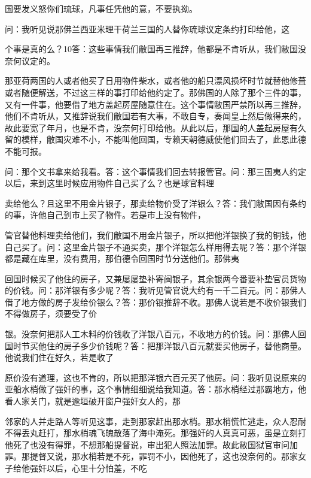 国要发义怒你们琉球，凡事任凭他的意，不要执拗。

问：我听见说那佛兰西亚米理干荷兰三国的人替你琉球议定条约打印给他，这

个事是真的么？10答：这些事情我们敝国再三推辞，他都是不肯听从，我们敝国没奈何议定的。

那亚荷两国的人或者他买了日用物件柴水，或者他的船只漂风损坏时节就替他修葺或者随便解送，不过这三样的事打印给他约定了。那佛国的人除了那个三件的事，又有一件事，他要借了地方盖起房屋随意住在。这个事情敝国严禁所以再三推辞，他们不肯听从，又推辞说我们敝国若有大事，不敢自专，奏闻皇上然后做得来的，故此要宽了年月，也是不肯，没奈何打印给他。从此以后，那国的人盖起房屋有久留的模样，敝国灾难不小，不能叫他回国，专赖天朝德威使他们回去了，此恩此德不能可报。

\vfill
\begin{BookNotes}
\end{BookNotes}

\noindent 问：那个文书拿来给我看。答：这个事情我们回去转报管官。问：那三国夷人约定以后，来到这里时候应用物件自己买了么？也是球官料理

卖给他么？且这里不用金片银子，那卖给物价受了洋银么？答：我们敝国因有条约的事，许他自己到市上买了物件。若是市上没有物件，

管官替他料理卖给他们，我们敝国不用金片银子，所以把他洋银换了我的铜钱，他自己买了。问：这里金片银子不通买卖，那个洋银怎么样用得去呢？答：那个洋银都是藏在库里，没有费用，那伯德令回国时节分送他们。那佛夷

回国时候买了他住的房子，又兼屡屡垫补寄闽银子，其余银两今番要补垫官员货物的价钱。问：那洋银有多少呢？答：我听见管官说大约有一千二百元。问：那佛人借了地方做的房子发给价银么？答：那价银推辞不收。那佛人说若是不收价银我们不得做房子，须要受了价

银。没奈何把那人工木料的价钱收了洋银八百元，不收地方的价钱。问：那佛人回国时节买他住的房子多少价钱呢？答：把那洋银八百元就要买他房子，替他商量。他说我们住在好久，若是收了

原价没有道理，这也不肯的，所以把那洋银六百元买了他房。问：我听见说原来的亚船水梢做了强奸的事，这个事情细细说给我知道。答：那水梢经过那霸地方，他看人家关门，就是逾垣破开窗户强奸女人的，那

邻家的人并走路人等听见这事，走到那家赶出那水梢。那水梢慌忙逃走，众人忍耐不得丢丸赶打，那水梢魂飞魄散落了海中淹死。那强奸的人真真可恶，虽是立刻打他死了也没有得罪，不想那船提督说，审出犯人照法加罪。故此敝国狱官审问加罪。那提督又说，那水梢若是不死，罪罚不小，因他死了，这也没奈何的。那家女子给他强奸以后，心里十分怕羞，不吃


